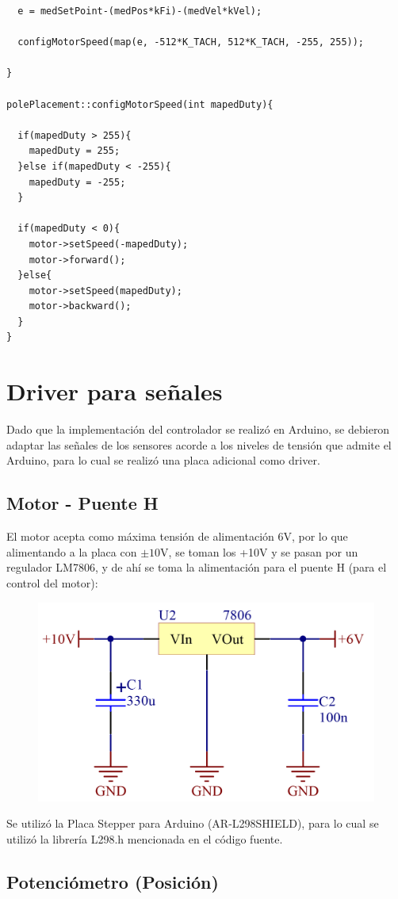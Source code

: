 \documentclass{article}
\begin{document}
\begin{lstlisting}
  e = medSetPoint-(medPos*kFi)-(medVel*kVel);

  configMotorSpeed(map(e, -512*K_TACH, 512*K_TACH, -255, 255));
  
}

polePlacement::configMotorSpeed(int mapedDuty){
  
  if(mapedDuty > 255){
    mapedDuty = 255;
  }else if(mapedDuty < -255){
    mapedDuty = -255;
  }

  if(mapedDuty < 0){
    motor->setSpeed(-mapedDuty);
    motor->forward();   
  }else{
    motor->setSpeed(mapedDuty);
    motor->backward();    
  }
}

\end{lstlisting}

\newpage

\section{Driver para señales}
Dado que la implementación del controlador se realizó en Arduino, se debieron adaptar las señales de los sensores acorde a los niveles de tensión que admite el Arduino, para lo cual se realizó una placa adicional como driver.

\subsection{Motor - Puente H}
El motor acepta como máxima tensión de alimentación 6V, por lo que alimentando a la placa con $\pm 10$V, se toman los +10V y se pasan por un regulador LM7806, y de ahí se toma la alimentación para el puente H (para el control del motor):

\begin{figure}[H]
\centering
\includegraphics[width=0.4\linewidth]{../Images/Regulador.png}
\end{figure}

Se utilizó la Placa Stepper para Arduino (AR-L298SHIELD), para lo cual se utilizó la librería L298.h mencionada en el código fuente.

\subsection{Potenciómetro (Posición)}
\end{document}
